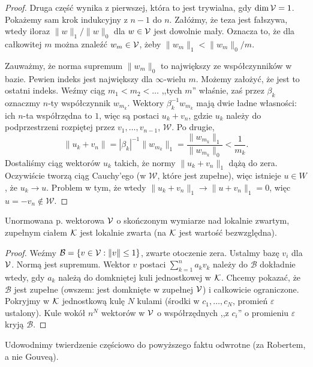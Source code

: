 \begin{proof}
	Druga część wynika z pierwszej, która to jest trywialna, gdy $\dim \mathcal V =1$.
	Pokażemy sam krok indukcyjny z $n-1$ do $n$.
	Załóżmy, że teza jest fałszywa, wtedy iloraz $\|w\|_1 / \|w\|_0$ dla $w \in \mathcal V$ jest dowolnie mały.
	Oznacza to, że dla całkowitej $m$ można znaleźć $w_m \in \mathcal V$, żeby $\|w_m\|_1 < \|w_m\|_0/m$.

	Zauważmy, że norma supremum $\|w_m\|_0$ to największy ze współczynników w bazie.
	Pewien indeks jest największy dla $\infty$-wielu $m$.
	Możemy założyć, że jest to ostatni indeks.
	Weźmy ciąg $m_1 <  m_2 < \dots$ ,,tych $m$'' właśnie, zaś przez $\beta_k$ oznaczmy $n$-ty współczynnik $w_{m_k}$.
	Wektory $\beta_k^{-1} w_{m_k}$ mają dwie ładne własności: ich $n$-ta współrzędna to $1$, więc są postaci $u_k + v_n$, gdzie $u_k$ należy do podprzestrzeni rozpiętej przez $v_1, \dots, v_{n-1}$, $\mathcal W$.
	Po drugie,
	\[
		\|u_k + v_n\| = |\beta_k|^{-1} \|w_{m_k}\|_1 = \frac{\|w_{m_k}\|_1}{\|w_{m_k}\|_0} < \frac 1 {m_k}.
	\]
	Dostaliśmy ciąg wektorów $u_k$ takich, że normy $\|u_k + v_n\|_1$ dążą do zera.
	Oczywiście tworzą ciąg Cauchy'ego (w $\mathcal W$, które jest zupełne), więc istnieje $u \in W$, że $u_k \to u$.
	Problem w tym, że wtedy $\|u_k + v_n\|_1 \to \|u + v_n\|_1 = 0$, więc $u = -v_n \not \in \mathcal W$.
\end{proof}

\begin{fakt}
	Unormowana p. wektorowa $\mathcal V$ o skończonym wymiarze nad lokalnie zwartym, zupełnym ciałem $\mathcal K$ jest lokalnie zwarta (na $\mathcal K$ jest wartość bezwzględna).
\end{fakt}

\begin{proof}
	Weźmy $\mathcal B = \{v \in \mathcal V : \|v\| \le 1\}$, zwarte otoczenie zera.
	Ustalmy bazę $v_i$ dla $\mathcal V$.
	Normą jest supremum.
	Wektor $v$ postaci $\sum_{k=1}^n a_k v_k$ należy do $\mathcal B$ dokładnie wtedy, gdy $a_k$ należą do domkniętej kuli jednostkowej w $\mathcal K$.
	Chcemy pokazać, że $\mathcal B$ jest zupełne (owszem: jest domknięte w zupełnej $\mathcal V$) i całkowicie ograniczone.
	Pokryjmy w $\mathcal K$ jednostkową kulę $N$ kulami (środki w $c_1, \dots, c_N$, promień $\varepsilon$ ustalony).
	Kule wokół $n^N$ wektorów w $\mathcal V$ o współrzędnych ,,z $c_i$'' o promieniu $\varepsilon$ kryją $\mathcal B$. 
\end{proof}

Udowodnimy twierdzenie częściowo do powyższego faktu odwrotne (za Robertem, a nie Gouveą).

